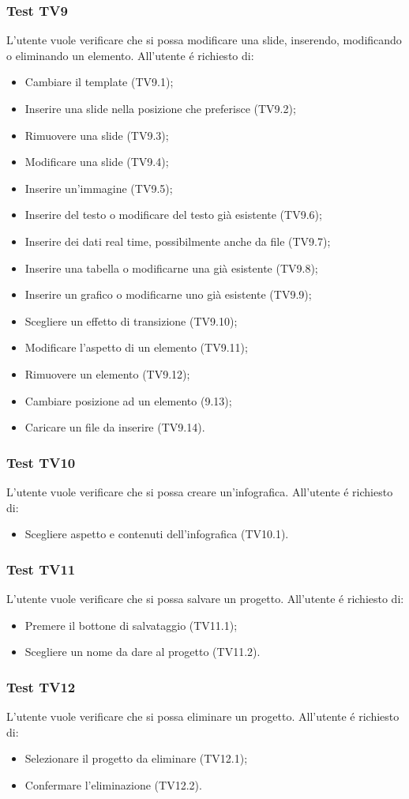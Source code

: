\subsubsection{Test TV9}
L'utente vuole verificare che si possa modificare una slide, inserendo, modificando o eliminando un elemento. \newline
All'utente é richiesto di:
\begin{itemize}
	\item Cambiare il template (TV9.1);
	\item Inserire una slide nella posizione che preferisce (TV9.2);
	\item Rimuovere una slide (TV9.3);
	\item Modificare una slide (TV9.4);
	\item Inserire un'immagine (TV9.5);
	\item Inserire del testo o modificare del testo già esistente (TV9.6);
	\item Inserire dei dati real time, possibilmente anche da file (TV9.7);
	\item Inserire una tabella o modificarne una già esistente (TV9.8);
	\item Inserire un grafico o modificarne uno già esistente (TV9.9);
	\item Scegliere un effetto di transizione (TV9.10);
	\item Modificare l'aspetto di un elemento (TV9.11);
	\item Rimuovere un elemento (TV9.12);
	\item Cambiare posizione ad un elemento (9.13);
	\item Caricare un file da inserire (TV9.14).
\end{itemize}

\subsubsection{Test TV10}
L'utente vuole verificare che si possa creare un'infografica. \newline
All'utente é richiesto di:
\begin{itemize}
	\item Scegliere aspetto e contenuti dell'infografica (TV10.1).
\end{itemize}

\subsubsection{Test TV11}
L'utente vuole verificare che si possa salvare un progetto. \newline
All'utente é richiesto di:
\begin{itemize}
	\item Premere il bottone di salvataggio (TV11.1);
	\item Scegliere un nome da dare al progetto (TV11.2).
\end{itemize}

\subsubsection{Test TV12}
L'utente vuole verificare che si possa eliminare un progetto. \newline
All'utente é richiesto di:
\begin{itemize}
	\item Selezionare il progetto da eliminare (TV12.1);
	\item Confermare l'eliminazione (TV12.2).
\end{itemize}